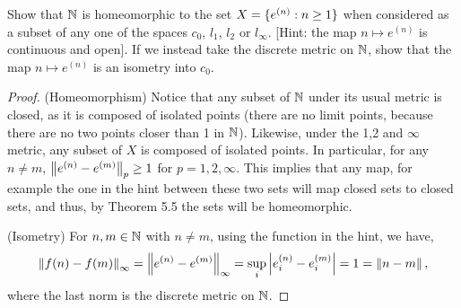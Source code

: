 \begin{exercise}{61}
Show that $\mathbb{N}$ is homeomorphic to the set $X=\{e^{(n)}:n\geq 1\}$ when considered as a subset of any one of the spaces $c_0$, $l_1$, $l_2$ or $l_\infty$.
[Hint: the map $n\mapsto e^{(n)}$ is continuous and open].
If we instead take the discrete metric on $\mathbb{N}$, show that the map $n\mapsto e^{(n)}$ is an isometry into $c_0$.
\end{exercise}
\begin{proof}
(Homeomorphism)
Notice that any subset of $\mathbb{N}$ under its usual metric is closed, as it is composed of isolated points (there are no limit points, because there are no two points closer than 1 in $\mathbb{N}$).
Likewise, under the 1,2 and $\infty$ metric, any subset of $X$ is composed of isolated points. 
In particular, for any $n\neq m$, $\left\lVert e^{(n)}-e^{(m)}\right\rVert_p\geq 1$ for $p=1,2,\infty$.
This implies that any map, for example the one in the hint between these two sets will map closed sets to closed sets, and thus, by Theorem 5.5 the sets will be homeomorphic.

(Isometry)
For $n,m\in\mathbb{N}$ with $n\neq m$, using the function in the hint, we have,
\begin{align*}
    \left\lVert f(n)-f(m)\right\rVert_\infty
    = \left\lVert e^{(n)}-e^{(m)}\right\rVert_\infty
    = \sup_{i}\left\lvert {e^{(n)}_i-e^{(m)}_i}\right\rvert
    = 1
    = \left\lVert n-m\right\rVert,
\end{align*}
where the last norm is the discrete metric on $\mathbb{N}$.
\end{proof} 
